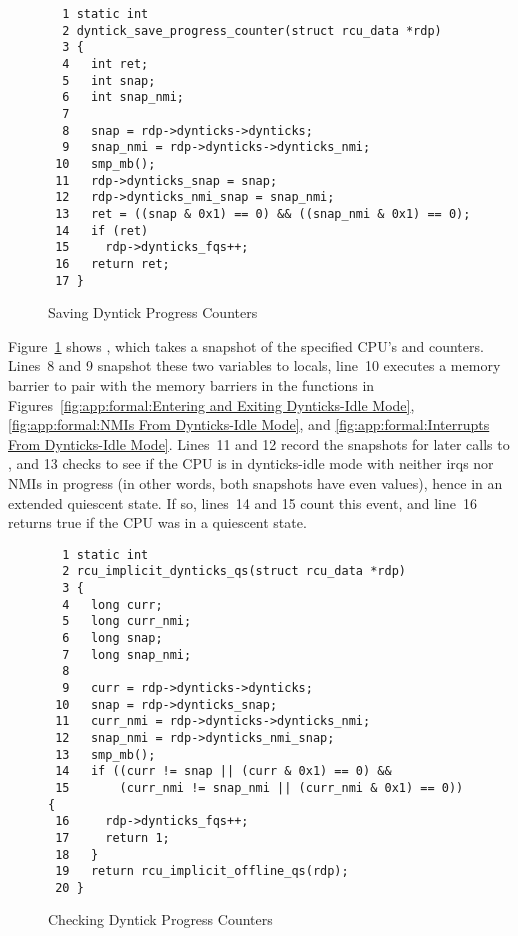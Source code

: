 \begin{figure}[tbp]
{ \scriptsize
\begin{verbatim}
  1 static int
  2 dyntick_save_progress_counter(struct rcu_data *rdp)
  3 {
  4   int ret;
  5   int snap;
  6   int snap_nmi;
  7
  8   snap = rdp->dynticks->dynticks;
  9   snap_nmi = rdp->dynticks->dynticks_nmi;
 10   smp_mb();
 11   rdp->dynticks_snap = snap;
 12   rdp->dynticks_nmi_snap = snap_nmi;
 13   ret = ((snap & 0x1) == 0) && ((snap_nmi & 0x1) == 0);
 14   if (ret)
 15     rdp->dynticks_fqs++;
 16   return ret;
 17 }
\end{verbatim}
}
\caption{Saving Dyntick Progress Counters}
\label{fig:app:formal:Saving Dyntick Progress Counters}
\end{figure}

Figure~\ref{fig:app:formal:Saving Dyntick Progress Counters}
shows , which takes a snapshot
of the specified CPU's  and 
counters.
Lines~8 and 9 snapshot these two variables to locals, line~10
executes a memory barrier to pair with the memory barriers in
the functions in
Figures~\ref{fig:app:formal:Entering and Exiting Dynticks-Idle Mode},
\ref{fig:app:formal:NMIs From Dynticks-Idle Mode}, and
\ref{fig:app:formal:Interrupts From Dynticks-Idle Mode}.
Lines~11 and 12 record the snapshots for later calls to
,
and 13 checks to see if the CPU is in dynticks-idle mode with
neither irqs nor NMIs in progress (in other words, both snapshots
have even values), hence in an extended quiescent state.
If so, lines~14 and 15 count this event, and line~16 returns
true if the CPU was in a quiescent state.

\begin{figure}[tbp]
{ \scriptsize
\begin{verbatim}
  1 static int
  2 rcu_implicit_dynticks_qs(struct rcu_data *rdp)
  3 {
  4   long curr;
  5   long curr_nmi;
  6   long snap;
  7   long snap_nmi;
  8
  9   curr = rdp->dynticks->dynticks;
 10   snap = rdp->dynticks_snap;
 11   curr_nmi = rdp->dynticks->dynticks_nmi;
 12   snap_nmi = rdp->dynticks_nmi_snap;
 13   smp_mb();
 14   if ((curr != snap || (curr & 0x1) == 0) &&
 15       (curr_nmi != snap_nmi || (curr_nmi & 0x1) == 0)) {
 16     rdp->dynticks_fqs++;
 17     return 1;
 18   }
 19   return rcu_implicit_offline_qs(rdp);
 20 }
\end{verbatim}
}
\caption{Checking Dyntick Progress Counters}
\label{fig:app:formal:Checking Dyntick Progress Counters}
\end{figure}

